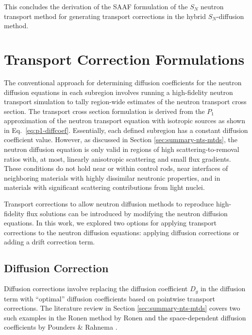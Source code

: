 This concludes the derivation of the \gls{SAAF} formulation of the $S_N$ neutron transport method
for generating transport corrections in the hybrid $S_N$-diffusion method.

\section{Transport Correction Formulations} \label{sec:transport-correction}

The conventional approach for determining diffusion coefficients for the neutron diffusion
equations in each subregion involves
running a high-fidelity neutron transport simulation to tally region-wide estimates of the neutron
transport cross section. The transport cross section formulation is derived from the $P_1$
approximation of the neutron transport equation with isotropic sources \cite{bell_nuclear_1970} as
shown in Eq.\ \ref{eq:p1-diffcoef}.
Essentially, each defined subregion has a constant diffusion coefficient value. However, as
discussed in Section \ref{sec:summary-nts-mtds}, the neutron diffusion
equation is only valid in regions of high scattering-to-removal ratios with, at most, linearly
anisotropic scattering and small flux gradients. These conditions do not hold near or within
control rods, near interfaces of neighboring materials with highly dissimilar neutronic properties,
and in materials with significant scattering contributions from light nuclei.

Transport corrections to allow neutron diffusion methods to reproduce high-fidelity flux solutions
can be introduced by modifying the neutron diffusion equations.
In this work, we explored two options for applying
transport corrections to the neutron diffusion equations: applying
diffusion corrections or adding a drift correction term.

\subsection{Diffusion Correction}

Diffusion corrections involve replacing the diffusion coefficient $D_g$ in the
diffusion term with ``optimal'' diffusion coefficients based on
pointwise transport corrections. The literature review in Section \ref{sec:summary-nts-mtds} covers
two such
examples in the Ronen method by Ronen \cite{ronen_accurate_2004} and the space-dependent diffusion
coefficients by Pounders \& Rahnema \cite{pounders_diffusion_2009}.

